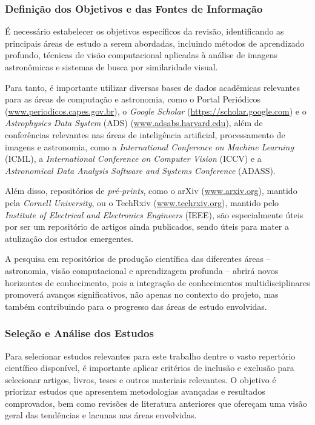 \documentclass[a4,12pt]{horizon-theme}
\begin{document}
\subsubsection{Definição dos Objetivos e das Fontes de Informação}
É necessário estabelecer os objetivos específicos da revisão, identificando as principais áreas de estudo a serem abordadas, incluindo métodos de aprendizado profundo, técnicas de visão computacional aplicadas à análise de imagens astronômicas e sistemas de busca por similaridade visual.

Para tanto, é importante utilizar diversas bases de dados acadêmicas relevantes para as áreas de computação e astronomia, como o Portal Periódicos (\url{www.periodicos.capes.gov.br}), o \emph{Google Scholar} (\url{https://scholar.google.com}) e o \emph{Astrophysics Data System} (ADS) (\url{www.adsabs.harvard.edu}), além de conferências relevantes nas áreas de inteligência artificial, processamento de imagens e astronomia, como a \emph{International Conference on Machine Learning} (ICML), a \emph{International Conference on Computer Vision} (ICCV) e a \emph{Astronomical Data Analysis Software and Systems Conference} (ADASS).

Além disso, repositórios de \emph{pré-prints}, como o arXiv (\url{www.arxiv.org}), mantido pela \emph{Cornell University}, ou o TechRxiv (\url{www.techrxiv.org}), mantido pelo \emph{Institute of Electrical and Electronics Engineers} (IEEE), são especialmente úteis por ser um repositório de artigos ainda publicados, sendo úteis para mater a atulização dos estudos emergentes.

A pesquisa em repositórios de produção científica das diferentes áreas -- astronomia, visão computacional e aprendizagem profunda -- abrirá novos horizontes de conhecimento, pois a integração de conhecimentos multidisciplinares promoverá avanços significativos, não apenas no contexto do projeto, mas também contribuindo para o progresso das áreas de estudo envolvidas.



\subsubsection{Seleção e Análise dos Estudos}
Para selecionar estudos relevantes para este trabalho dentre o vasto repertório científico disponível, é importante aplicar critérios de inclusão e exclusão para selecionar artigos, livros, teses e outros materiais relevantes. O objetivo é priorizar estudos que apresentem metodologias avançadas e resultados comprovados, bem como revisões de literatura anteriores que ofereçam uma visão geral das tendências e lacunas nas áreas envolvidas.
\end{document}
